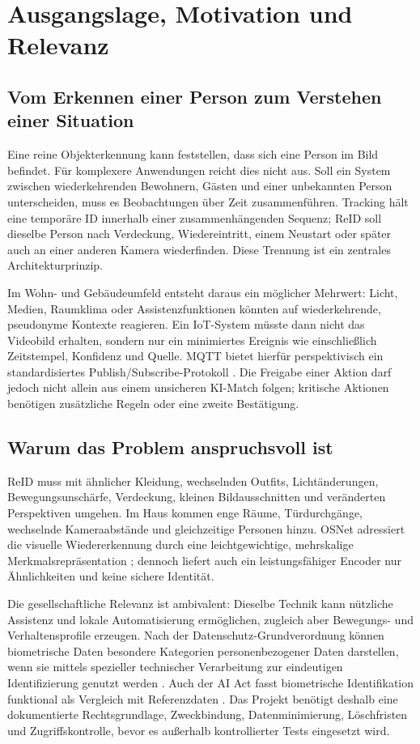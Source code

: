 \section{Ausgangslage, Motivation und Relevanz}

\subsection{Vom Erkennen einer Person zum Verstehen einer Situation}

Eine reine Objekterkennung kann feststellen, dass sich eine Person im Bild
befindet. Für komplexere Anwendungen reicht dies nicht aus. Soll ein System
zwischen wiederkehrenden Bewohnern, Gästen und einer unbekannten Person
unterscheiden, muss es Beobachtungen über Zeit zusammenführen. Tracking hält
eine temporäre ID innerhalb einer zusammenhängenden Sequenz; ReID soll dieselbe
Person nach Verdeckung, Wiedereintritt, einem Neustart oder später auch an einer
anderen Kamera wiederfinden. Diese Trennung ist ein zentrales
Architekturprinzip.

Im Wohn- und Gebäudeumfeld entsteht daraus ein möglicher Mehrwert: Licht,
Medien, Raumklima oder Assistenzfunktionen könnten auf wiederkehrende,
pseudonyme Kontexte reagieren. Ein IoT-System müsste dann nicht das Videobild
erhalten, sondern nur ein minimiertes Ereignis wie
 einschließlich Zeitstempel,
Konfidenz und Quelle. MQTT bietet hierfür perspektivisch ein standardisiertes
Publish/Subscribe-Protokoll \citep{oasis2019mqtt}. Die Freigabe einer Aktion
darf jedoch nicht allein aus einem unsicheren KI-Match folgen; kritische
Aktionen benötigen zusätzliche Regeln oder eine zweite Bestätigung.

\subsection{Warum das Problem anspruchsvoll ist}

ReID muss mit ähnlicher Kleidung, wechselnden Outfits, Lichtänderungen,
Bewegungsunschärfe, Verdeckung, kleinen Bildausschnitten und veränderten
Perspektiven umgehen. Im Haus kommen enge Räume, Türdurchgänge, wechselnde
Kameraabstände und gleichzeitige Personen hinzu. OSNet adressiert die visuelle
Wiedererkennung durch eine leichtgewichtige, mehrskalige Merkmalsrepräsentation
\citep{zhou2019osnet}; dennoch liefert auch ein leistungsfähiger Encoder nur
Ähnlichkeiten und keine sichere Identität.

Die gesellschaftliche Relevanz ist ambivalent: Dieselbe Technik kann nützliche
Assistenz und lokale Automatisierung ermöglichen, zugleich aber Bewegungs- und
Verhaltensprofile erzeugen. Nach der Datenschutz-Grundverordnung können
biometrische Daten besondere Kategorien personenbezogener Daten darstellen,
wenn sie mittels spezieller technischer Verarbeitung zur eindeutigen
Identifizierung genutzt werden \citep{eu2016gdpr}. Auch der AI Act fasst
biometrische Identifikation funktional als Vergleich mit Referenzdaten
\citep{eu2024aiact}. Das Projekt benötigt deshalb eine dokumentierte
Rechtsgrundlage, Zweckbindung, Datenminimierung, Löschfristen und
Zugriffskontrolle, bevor es außerhalb kontrollierter Tests eingesetzt wird.


